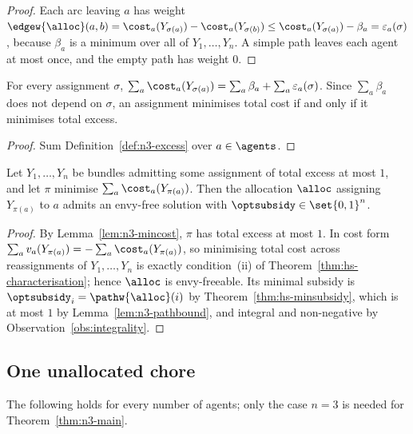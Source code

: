 \begin{proof}
Each arc leaving $a$ has weight
$\edgew{\alloc}(a,b) = \cost_a(Y_{\sigma(a)}) - \cost_a(Y_{\sigma(b)}) \le
\cost_a(Y_{\sigma(a)}) - \beta_a = \varepsilon_a(\sigma)$, because $\beta_a$ is
a minimum over all of $Y_1,\dots,Y_n$. A simple path leaves each agent at most
once, and the empty path has weight $0$.
\end{proof}

\begin{lemma}
\label{lem:n3-mincost}
For every assignment $\sigma$,
$\sum_a \cost_a(Y_{\sigma(a)}) = \sum_a \beta_a + \sum_a
\varepsilon_a(\sigma)$. Since $\sum_a \beta_a$ does not depend on $\sigma$, an
assignment minimises total cost if and only if it minimises total excess.
\end{lemma}

\begin{proof}
Sum Definition~\ref{def:n3-excess} over $a \in \agents$.
\end{proof}

\begin{corollary}
\label{cor:n3-criterion}
Let $Y_1,\dots,Y_n$ be bundles admitting some assignment of total excess at
most $1$, and let $\pi$ minimise $\sum_a \cost_a(Y_{\pi(a)})$. Then the
allocation $\alloc$ assigning $Y_{\pi(a)}$ to $a$ admits an envy-free solution
with $\optsubsidy \in \set{0,1}^n$.
\end{corollary}

\begin{proof}
By Lemma~\ref{lem:n3-mincost}, $\pi$ has total excess at most $1$. In cost form
$\sum_a v_a(Y_{\pi(a)}) = -\sum_a \cost_a(Y_{\pi(a)})$, so minimising total
cost across reassignments of $Y_1,\dots,Y_n$ is exactly
condition~(ii) of Theorem~\ref{thm:hs-characterisation}; hence $\alloc$ is
envy-freeable. Its minimal subsidy is $\optsubsidy_i = \pathw{\alloc}(i)$ by
Theorem~\ref{thm:hs-minsubsidy}, which is at most $1$ by
Lemma~\ref{lem:n3-pathbound}, and integral and non-negative by
Observation~\ref{obs:integrality}.
\end{proof}

\subsection{One unallocated chore}
\label{sec:n3-one}

The following holds for every number of agents; only the case $n = 3$ is needed
for Theorem~\ref{thm:n3-main}.

